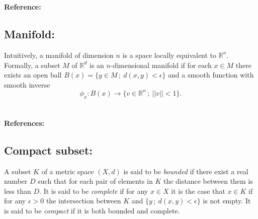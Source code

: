 \documentclass{amsart}
\begin{document}
	\paragraph{\\ Reference:} \cite{takens1981detecting}
	
	\subsection*{Manifold:} \label{manifold}
	
	Intuitively, a manifold of dimension $n$ is a space locally equivalent to $\mathbb R^n$. Formally, a subset $M$ of $\mathbb R^d$ is an $n$-dimensional manifold if for each $x \in M$ there exists an open ball $B(x) = \{ y \in M\,;\ d(x,y) < \epsilon\}$ and a smooth function with smooth inverse 
	\begin{equation*}
	\phi_x : B(x) \to \{v \in \mathbb R^n\,;\ ||v||<1\}.
	\end{equation*}
	
	\paragraph{\\ References:} \cite{milnor1997topology,guillemin2010differential}
	
	\subsection*{Compact subset:}	\label{compact subset}
	
	A subset $K$ of a metric space $(X,d)$ is said to be \textit{bounded} if there exist a real number $D$ such that for each pair of elements in $K$ the distance between them is less than $D$. It is said to be \textit{complete} if for any $x \in X$ it is the case that $x \in K$ if for any $\epsilon > 0$ the intersection between $K$ and $\{y \,;\ d(x,y) < \epsilon \}$ is not empty. It is said to be \textit{compact} if it is both bounded and complete.
	
	{}
	
	
\end{document}
